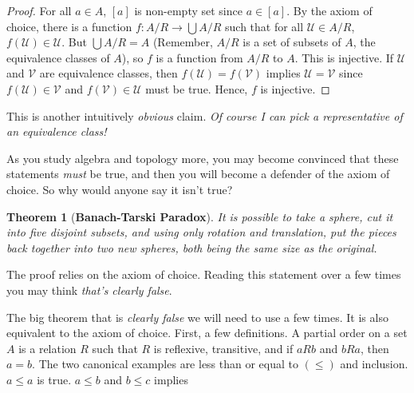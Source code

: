 \documentclass{article}
\theoremstyle{plain}
\newtheorem{theorem}{Theorem}[section]
\theoremstyle{normal}
\newenvironment{definition}{%
    \pushQED{\qed}\renewcommand{\qedsymbol}{$\blacksquare$}\definitionx%
}{%
    \popQED\enddefinitionx%
}
\begin{document}
        \begin{proof}
            For all $a\in{A}$, $[a]$ is non-empty set since $a\in[a]$. By the
            axiom of choice, there is a function
            $f:A/R\rightarrow\bigcup{A}/R$ such that for all
            $\mathcal{U}\in{A}/R$, $f(\mathcal{U})\in\mathcal{U}$. But
            $\bigcup{A}/R=A$ (Remember, $A/R$ is a set of subsets of $A$, the
            equivalence classes of $A$), so $f$ is a function from
            $A/R$ to $A$. This is injective. If
            $\mathcal{U}$ and $\mathcal{V}$ are equivalence classes,
            then $f(\mathcal{U})=f(\mathcal{V})$ implies
            $\mathcal{U}=\mathcal{V}$ since
            $f(\mathcal{U})\in\mathcal{V}$ and $f(\mathcal{V})\in\mathcal{U}$
            must be true. Hence, $f$ is injective.
        \end{proof}
        This is another intuitively \textit{obvious} claim.
        \textit{Of course I can pick a representative of an equivalence class!}
        \par\hfill\par
        As you study algebra and topology more, you may become convinced that
        these statements \textit{must} be true, and then you will become a
        defender of the axiom of choice. So why would anyone say it isn't true?
        \begin{theorem}[\textbf{Banach-Tarski Paradox}]
            It is possible to take a sphere, cut it into five disjoint subsets,
            and using only rotation and translation, put the pieces back
            together into two new spheres, both being the same size as the
            original. 
        \end{theorem}
        The proof relies on the axiom of choice. Reading this statement over
        a few times you may think \textit{that's clearly false}.
        \par\hfill\par
        The big theorem that is \textit{clearly false} we will need to use a
        few times. It is also equivalent to the axiom of choice.
        First, a few definitions.
        \begin{definition}[\textbf{Partial Order}]
            A partial order on a set $A$ is a relation $R$ such that
            $R$ is reflexive, transitive, and if $aRb$ and $bRa$, then
            $a=b$.
        \end{definition}
        The two canonical examples are less than or equal to $(\leq)$ and
        inclusion. $a\leq{a}$ is true. $a\leq{b}$ and $b\leq{c}$ implies
\end{document}
